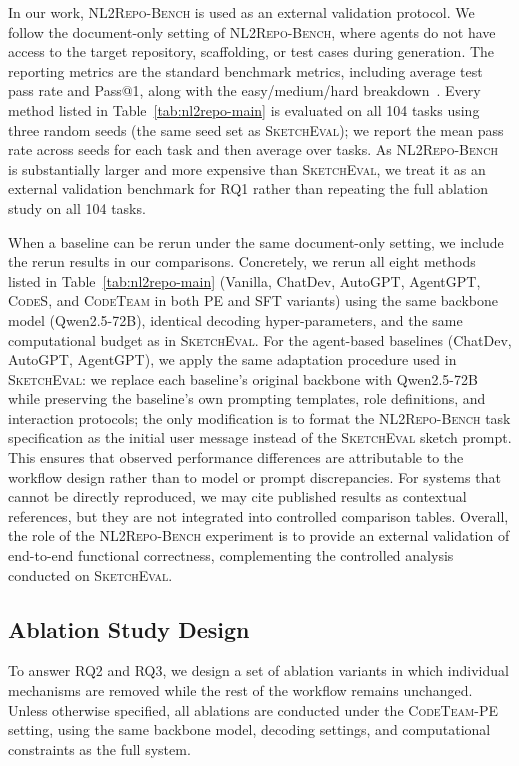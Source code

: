 \documentclass[format=acmsmall, review=false, screen=true]{acmart}
\newcommand{\tool}{\textsc{CodeTeam}\xspace}
\newcommand{\codes}{\textsc{CodeS}\xspace}
\newcommand{\sketcheval}{\textsc{SketchEval}\xspace}
\newcommand{\nlrepobench}{\textsc{NL2Repo-Bench}\xspace}
\begin{document}
In our work, \nlrepobench is used as an external validation protocol. We follow the document-only setting of \nlrepobench, where agents do not have access to the target repository, scaffolding, or test cases during generation. The reporting metrics are the standard benchmark metrics, including average test pass rate and Pass@1, along with the easy/medium/hard breakdown~\cite{Ding2025NL2RepoBench}. Every method listed in Table~\ref{tab:nl2repo-main} is evaluated on all 104 tasks using three random seeds (the same seed set as \sketcheval); we report the mean pass rate across seeds for each task and then average over tasks. As \nlrepobench is substantially larger and more expensive than \sketcheval, we treat it as an external validation benchmark for RQ1 rather than repeating the full ablation study on all 104 tasks.

When a baseline can be rerun under the same document-only setting, we include the rerun results in our comparisons. Concretely, we rerun all eight methods listed in Table~\ref{tab:nl2repo-main} (Vanilla, ChatDev, AutoGPT, AgentGPT, \codes, and \tool in both PE and SFT variants) using the same backbone model (Qwen2.5-72B), identical decoding hyper-parameters, and the same computational budget as in \sketcheval. For the agent-based baselines (ChatDev, AutoGPT, AgentGPT), we apply the same adaptation procedure used in \sketcheval: we replace each baseline's original backbone with Qwen2.5-72B while preserving the baseline's own prompting templates, role definitions, and interaction protocols; the only modification is to format the \nlrepobench task specification as the initial user message instead of the \sketcheval sketch prompt. This ensures that observed performance differences are attributable to the workflow design rather than to model or prompt discrepancies. For systems that cannot be directly reproduced, we may cite published results as contextual references, but they are not integrated into controlled comparison tables. Overall, the role of the \nlrepobench experiment is to provide an external validation of end-to-end functional correctness, complementing the controlled analysis conducted on \sketcheval.

\subsection{Ablation Study Design}
\label{subsec:ablation}
To answer RQ2 and RQ3, we design a set of ablation variants in which individual mechanisms are removed while the rest of the workflow remains unchanged. Unless otherwise specified, all ablations are conducted under the \tool-PE setting, using the same backbone model, decoding settings, and computational constraints as the full system.
\end{document}

